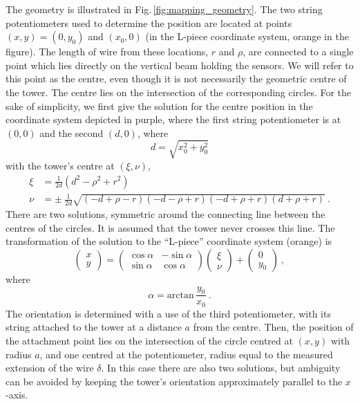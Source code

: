 The geometry is illustrated in Fig.\,\ref{fig:mapping_geometry}.
The two string potentiometers used to determine the position are located at points $(x, y) = (0, y_0)$ and $(x_0, 0)$ (in the L-piece coordinate system, orange in the figure).
The length of wire from these locations, $r$ and $\rho$, are connected to a single point which lies directly on the vertical beam holding the sensors.
We will refer to this point as the centre, even though it is not necessarily the geometric centre of the tower.
The centre lies on the intersection of the corresponding circles.
For the sake of simplicity, we first give the solution for the centre position in the coordinate system depicted in purple,
where the first string potentiometer is at $(0,0)$ and the second $(d, 0)$, where
\begin{equation}
  d = \sqrt{x_0^2 + y_0^2}
\end{equation}
with the tower's centre at $(\xi, \nu)$,
\begin{align}
  \xi & = \frac{1}{2d} \left( d^2 - \rho^2 + r^2 \right) \\
  \nu & = \pm\ \frac{1}{2d} \sqrt{ (-d + \rho - r) (-d - \rho + r) (-d + \rho + r) (d + \rho + r) } \ .
\end{align}
There are two solutions, symmetric around the connecting line between the centres of the circles.
It is assumed that the tower never crosses this line.
The transformation of the solution to the ``L-piece'' coordinate system (orange) is
\begin{equation}
  \begin{pmatrix}
    x \\
    y
  \end{pmatrix}
  =
  \begin{pmatrix}
    \cos \alpha & -\sin \alpha \\
    \sin \alpha & \cos \alpha
  \end{pmatrix}
  \begin{pmatrix}
    \xi \\
    \nu
  \end{pmatrix}
  +
  \begin{pmatrix}
    0 \\
    y_0
  \end{pmatrix} \ ,
\end{equation}
where
\begin{equation}
  \alpha = \mathrm{arctan}\, \frac{y_0}{x_0} \ .
\end{equation}
The orientation is determined with a use of the third potentiometer, with its string attached to the tower at a distance $a$ from the centre.
Then, the position of the attachment point lies on the intersection of the circle centred at $(x,y)$ with radius $a$, and one centred at the potentiometer, radius equal to the measured extension of the wire $\delta$.
In this case there are also two solutions, but ambiguity can be avoided by keeping the tower's orientation approximately parallel to the $x$-axis.

